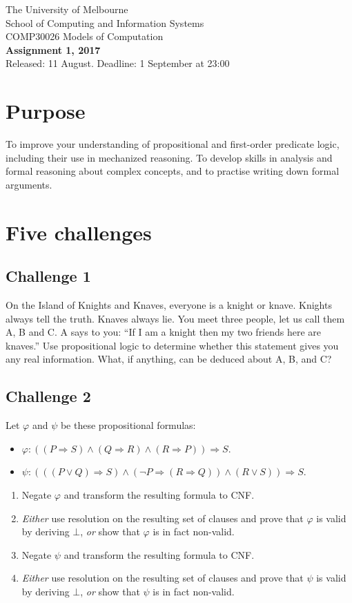 \documentclass[12pt]{article}
\newcommand{\impl}{\mathbin{\Rightarrow}}
\begin{document}
\begin{center}
{\sc The University of Melbourne
\\
School of Computing and Information Systems
\\ 
COMP30026 Models of Computation}
\bigskip \\
{\Large\bf Assignment 1, 2017}
\bigskip \\
{\large Released: 11 August.  Deadline: 1 September at 23:00}
\end{center}

\section*{Purpose}
To improve your understanding of propositional and first-order 
predicate logic, including their use in mechanized reasoning.
To develop skills in analysis and formal reasoning about
complex concepts, and to practise writing down formal arguments.

\section*{Five challenges}

\subsection*{Challenge 1}
On the Island of Knights and Knaves, everyone is a knight or knave.
Knights always tell the truth.
Knaves always lie.
You meet three people, let us call them A, B and C.
A says to you:
``If I am a knight then my two friends here are knaves.''
Use propositional logic to determine whether this statement
gives you any real information.
What, if anything, can be deduced about A, B, and C?

\subsection*{Challenge 2}
Let $\varphi$ and $\psi$ be these propositional formulas:
\begin{itemize}
\item
$\varphi : ((P \impl S) \land (Q \impl R) \land (R \impl P)) \impl S$.
\item
$\psi : (((P \lor Q) \impl S) \land (\neg P \impl (R \impl Q)) \land (R \lor S)) \impl S$.
\end{itemize}
\begin{enumerate}
\item
Negate $\varphi$ and transform the resulting formula to CNF.
\item
\emph{Either} use resolution on the resulting set of clauses and prove
that $\varphi$ is valid by deriving $\bot$, \emph{or} show that
$\varphi$ is in fact non-valid.
\item
Negate $\psi$ and transform the resulting formula to CNF.
\item
\emph{Either} use resolution on the resulting set of clauses and prove
that $\psi$ is valid by deriving $\bot$, \emph{or} show that $\psi$ is
in fact non-valid.
\end{enumerate}
\end{document}
